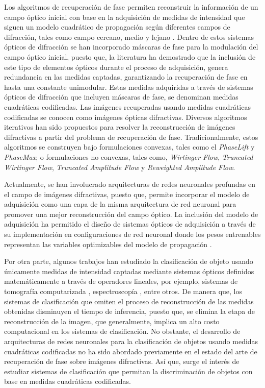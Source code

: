 Los algoritmos de recuperación de fase permiten reconstruir la información de un campo óptico inicial con base en la adquisición de medidas de intensidad que siguen un modelo cuadrático de propagación según diferentes campos de difracción, tales como campo cercano, medio y lejano \cite{goodman2005introduction}. Dentro de estos sistemas ópticos de difracción se han incorporado máscaras de fase para la modulación del campo óptico inicial, puesto que, la literatura ha demostrado que la inclusión de este tipo de elementos ópticos durante el proceso de adquisición, genera redundancia en las medidas captadas, garantizando la recuperación de fase en hasta una constante unimodular\cite{candes_CDP}. Estas medidas adquiridas a través de sistemas ópticos de difracción que incluyen máscaras de fase, se denominan medidas cuadráticas codificadas. Las imágenes recuperadas usando medidas cuadráticas codificadas se conocen como imágenes ópticas difractivas. Diversos algoritmos iterativos han sido propuestos para resolver la reconstrucción de imágenes difractivas a partir del problema de recuperación de fase. Tradicionalmente, estos algoritmos se construyen bajo formulaciones convexas, tales como el \textit{PhaseLift}\cite{candes2013phaselift} y \textit{PhaseMax}\cite{goldstein2018phasemax}; o formulaciones no convexas, tales como, \textit{Wirtinger Flow}\cite{candes2015phase}, \textit{Truncated Wirtinger Flow}\cite{chen2017solving}, \textit{Truncated Amplitude Flow}\cite{wang2017solving} y \textit{Reweighted Amplitude Flow}\cite{wang2018phase}.  

Actualmente, se han involucrado arquitecturas de redes neuronales profundas en el campo de imágenes difractivas, puesto que, permite incorporar el modelo de adquisición como una capa de la misma arquitectura de red neuronal para promover una mejor reconstrucción del campo óptico. La inclusión del modelo de adquisición ha permitido el diseño de sistemas ópticos de adquisición a través de su implementación en configuraciones de red neuronal donde los pesos entrenables representan las variables optimizables del modelo de propagación \cite{cai2020learning}. 

Por otra parte, algunos trabajos han estudiado la clasificación de objeto usando únicamente medidas de intensidad captadas mediante sistemas ópticos definidos matemáticamente a través de operadores lineales, por ejemplo, sistemas de tomografía computarizada \cite{douarre2020value}, espectroscopía \cite{bacca2021deep}, entre otros. De manera que, los sistemas de clasificación que omiten el proceso de reconstrucción de las medidas obtenidas disminuyen el tiempo de inferencia, puesto que, se elimina la etapa de reconstrucción de la imagen, que generalmente, implica un alto costo computacional en los sistemas de clasificación. No obstante, el desarrollo de arquitecturas de redes neuronales para la clasificación de objetos usando medidas cuadráticas codificadas no ha sido abordado previamente en el estado del arte de recuperación de fase sobre imágenes difractivas. Así que, surge el interés de estudiar sistemas de clasificación que permitan la discriminación de objetos con base en medidas cuadráticas codificadas.

